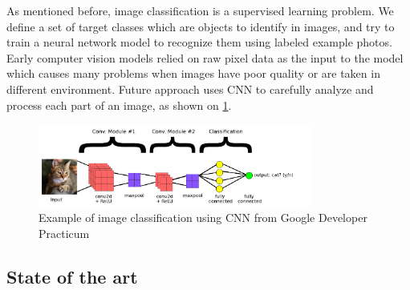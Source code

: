 \documentclass[../Main.tex]{subfiles}
\begin{document}
    As mentioned before, image classification is a supervised learning problem. We define a set of target classes which are objects to identify in images, and try to train a neural network model to recognize them using labeled example photos. Early computer vision models relied on raw pixel data as the input to the model which causes many problems when images have poor quality or are taken in different environment. Future approach uses CNN to carefully analyze and process each part of an image, as shown on \ref{fig:image-classification}. 
    
    \begin{figure}[H]
        \centering
        \includegraphics[width=0.8\textwidth]{Images/02_imclass_google.png}
        \caption{Example of image classification using CNN from Google Developer Practicum \cite{googledev-images}}
        \label{fig:image-classification}
    \end{figure}

\newpage

\subsection{State of the art}
\end{document}
